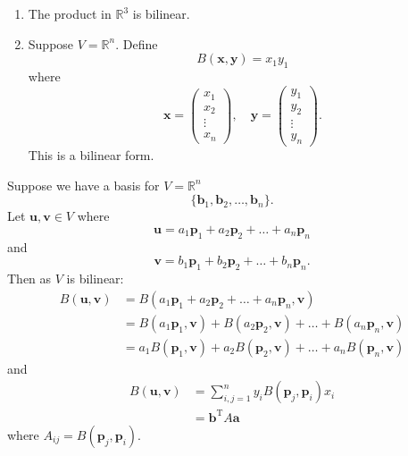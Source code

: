 \begin{example}
    \begin{enumerate}
        \item The product in $\mathbb{R}^3$ is bilinear.
        \item Suppose $V = \mathbb{R}^n$. Define \[ B(\bm{x}, \bm{y}) = x_1 y_1 \] where
        \[
            \bm{x} =
            \begin{pmatrix}
                x_1 \\ x_2 \\ \vdots \\ x_n
            \end{pmatrix}
            , \quad \bm{y} =
            \begin{pmatrix}
                y_1 \\ y_2 \\ \vdots \\ y_n
            \end{pmatrix}
            .
        \]
        This is a bilinear form.
    \end{enumerate}
\end{example}

\begin{remark}
    Suppose we have a basis for $V = \mathbb{R}^n$ \[ \{ \bm{b}_1, \bm{b}_2, \ldots, \bm{b}_n \}. \] Let $\bm{u}, \bm{v} \in V$ where \[ \bm{u} = a_1 \bm{p}_1 + a_2 \bm{p}_2 + \ldots + a_n \bm{p}_n \] and \[ \bm{v} = b_1 \bm{p}_1 + b_2 \bm{p}_2 + \ldots + b_n \bm{p}_n. \] Then as $V$ is bilinear:
    \begin{align*}
        B(\bm{u}, \bm{v}) &= B(a_1 \bm{p}_1 + a_2 \bm{p}_2 + \ldots + a_n \bm{p}_n, \bm{v}) \\
        &= B(a_1 \bm{p}_1, \bm{v}) + B(a_2 \bm{p}_2, \bm{v}) + \ldots + B(a_n \bm{p}_n, \bm{v}) \\
        &= a_1 B(\bm{p}_1, \bm{v}) + a_2 B(\bm{p}_2, \bm{v}) + \ldots + a_n B(\bm{p}_n, \bm{v}) 
    \end{align*}
    and
    \begin{align*}
        B(\bm{u}, \bm{v}) &= \sum_{i, j = 1}^{n} y_i B(\bm{p}_j, \bm{p}_i) x_i \\
        &= \bm{b}^{\mathrm{T}} A \bm{a}
    \end{align*}
    where $A_{ij} = B(\bm{p}_j, \bm{p}_i)$.
\end{remark}

